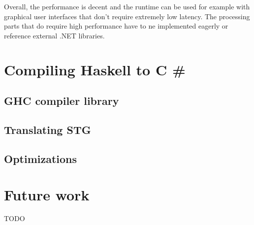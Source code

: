 \documentclass[en]{pracamgr}
\newcommand{\shrp}{%
  {\fontfamily{ppl}\selectfont\#%
  }}
\begin{document}
Overall, the performance is decent and the runtime can be used
for example with graphical user interfaces that don't require
extremely low latency. The processing parts that do
require high performance have to ne implemented eagerly
or reference external .NET libraries.

\chapter{Compiling Haskell to C\shrp{}}\label{r:compiler}

\section{GHC compiler library}

\section{Translating STG}

\section{Optimizations}

\chapter{Future work}\label{r:future}

TODO
\end{document}
